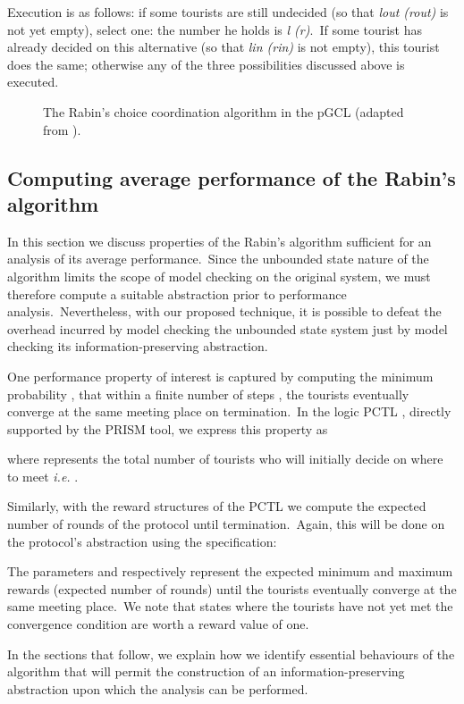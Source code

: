 \documentclass[numbers,copyright,creativecommons]{eptcs}
\begin{document}
Execution is as follows: if some tourists are still undecided (so that {\it lout (rout)} is not yet empty), select one:
the number he holds is {\it l (r)}.\ If some tourist has already decided on this alternative (so that {\it lin (rin)} is
not empty), this tourist does the same; otherwise any of the three possibilities discussed above
is executed.

\begin{figure}
\small

\caption{\rm The Rabin's choice coordination algorithm in the pGCL (adapted from \cite{ARP}).}\label{fig:DCpGCL}
\end{figure}

\subsection{Computing average performance of the Rabin's algorithm}
In this section we discuss properties of the Rabin's algorithm sufficient for an analysis of its average performance.\ Since the unbounded state nature of the algorithm limits the scope of model checking on the original system, we must therefore compute a suitable abstraction prior to performance analysis.\ Nevertheless, with our proposed technique, it is possible to defeat the overhead incurred by model checking the unbounded state system just by model checking its information-preserving abstraction.

One performance property of interest is captured by computing the minimum probability , that within a finite number of  steps , the tourists eventually converge at the same meeting place on termination.\ In the logic PCTL \cite{PCTL}, directly supported by the PRISM tool, we express this property as

where  represents the total number of tourists who will initially decide on where to meet {\it i.e.} .\

Similarly, with the reward structures \cite{KNP07} of the PCTL we compute the expected number of rounds of the protocol until termination.\ Again, this will be done on the protocol's abstraction using the specification:
 
The parameters  and  respectively represent the expected minimum and maximum rewards (expected number of rounds)
until the tourists eventually converge at the same meeting place.\ We note that states where the tourists have not yet
 met the convergence condition are worth a reward value of one.

In the sections that follow, we explain how we identify essential behaviours of the algorithm that will permit the construction of an information-preserving abstraction upon which the analysis can be performed.
\end{document}
